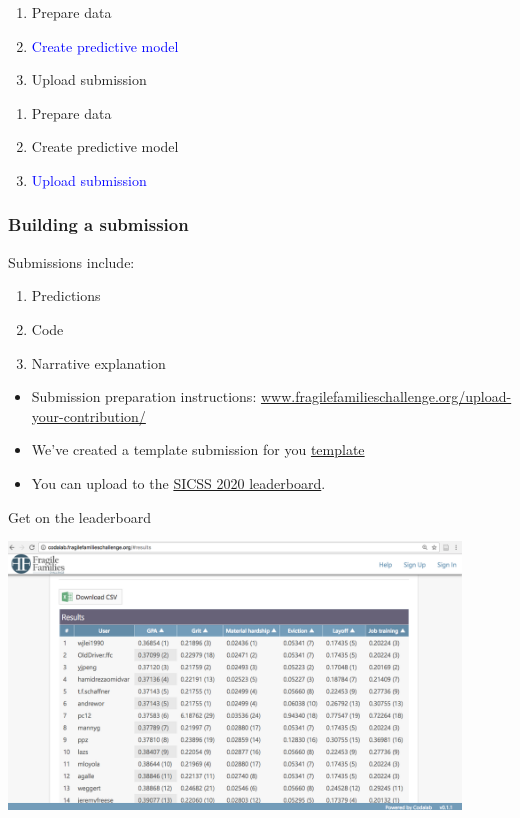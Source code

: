 \documentclass[aspectratio=169]{beamer}
\begin{document}
\begin{frame}

\begin{enumerate}
\item Prepare data
\item \textcolor{blue}{Create predictive model}
\item Upload submission
\end{enumerate}

\end{frame}
\begin{frame}

\begin{enumerate}
\item Prepare data
\item Create predictive model
\item \textcolor{blue}{Upload submission}
\end{enumerate}

\end{frame}
\begin{frame}
\frametitle{Building a submission}

Submissions include:
\begin{enumerate}
\item Predictions
\item Code
\item Narrative explanation
\end{enumerate}

\vfill
\begin{itemize}
\item Submission preparation instructions: \href{http://www.fragilefamilieschallenge.org/upload-your-contribution/}{www.fragilefamilieschallenge.org/upload-your-contribution/} \pause
\item We've created a template submission for you \href{TODO IAN: Add url}{template} \pause
\item You can upload to the \href{TODO IAN: Add url}{SICSS 2020 leaderboard}.
\end{itemize}

\end{frame}
\begin{frame}{Get on the leaderboard}

\includegraphics[width = 0.9\textwidth]{figures/leaderboard}

\end{frame}
\end{document}
